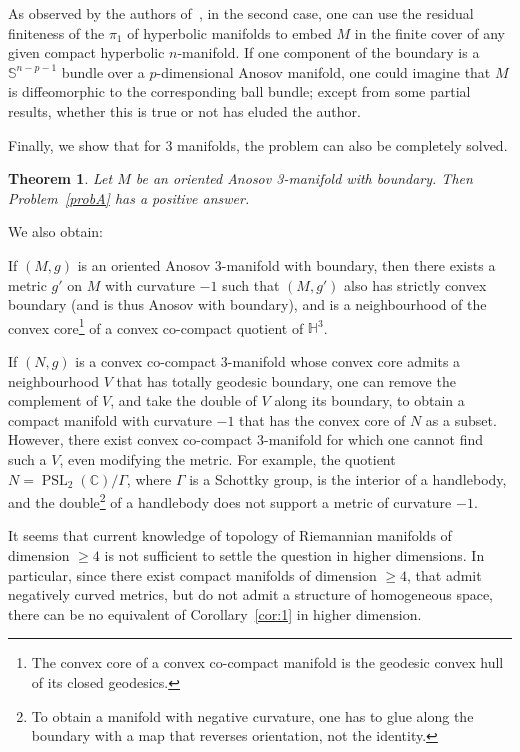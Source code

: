\documentclass[10pt]{amsart}
\newtheorem{theo}{Theorem}[section]
\theoremstyle{definition}\newtheorem{defi}[theo]{Definition}\newtheorem{rema}[theo]{Remark}\newtheorem{exam}[theo]{Example}\newtheorem{exem}[theo]{Example}\newtheorem{nota}[theo]{Notation}
\newcommand{\Ss}{\mathbb{S}}
\newcommand{\C}{\mathbb{C}}
\newcommand{\Hh}{\mathbb{H}}
\DeclareMathOperator{\PSL}{PSL}
\theoremstyle{plain}
\begin{document}
As observed by the authors of~\cite{Chen-Erchenko-Gogolev}, in the second case, one can use the residual finiteness of the $\pi_1$ of hyperbolic manifolds to embed $M$ in the finite cover of any given compact hyperbolic $n$-manifold. If one component of the boundary is a $\Ss^{n-p-1}$ bundle over a $p$-dimensional Anosov manifold, one could imagine that $M$ is diffeomorphic to the corresponding ball bundle; except from some partial results, whether this is true or not has eluded the author.

Finally, we show that for 3 manifolds, the problem can also be completely solved.

\begin{theo}\label{thm:3D}
Let $M$ be an oriented Anosov 3-manifold with boundary. Then Problem~\ref{probA} has a positive answer.
\end{theo}

We also obtain:
\begin{coro}\label{cor:1}
If $(M,g)$ is an oriented Anosov 3-manifold with boundary, then there exists a metric $g'$ on $M$ with curvature $-1$ such that $(M,g')$ also has strictly convex boundary (and is thus Anosov with boundary), and is a neighbourhood of the convex core\footnote{The convex core of a convex co-compact manifold is the geodesic convex hull of its closed geodesics.} of a convex co-compact quotient of $\Hh^3$.
\end{coro}

If $(N,g)$ is a convex co-compact 3-manifold whose convex core admits a neighbourhood $V$ that has totally geodesic boundary, one can remove the complement of $V$, and take the double of $V$ along its boundary, to obtain a compact manifold with curvature $-1$ that has the convex core of $N$ as a subset. However, there exist convex co-compact 3-manifold for which one cannot find such a $V$, even modifying the metric. For example, the quotient $N=\PSL_2(\C)/\Gamma$, where $\Gamma$ is a Schottky group, is the interior of a handlebody, and the double\footnote{To obtain a manifold with negative curvature, one has to glue along the boundary with a map that reverses orientation, not the identity.} of a handlebody does not support a metric of curvature $-1$.

It seems that current knowledge of topology of Riemannian manifolds of dimension $\geq 4$ is not sufficient to settle the question in higher dimensions. In particular, since there exist compact manifolds of dimension $\geq 4$, that admit negatively curved metrics, but do not admit a structure of homogeneous space, there can be no equivalent of Corollary~\ref{cor:1} in higher dimension.
\end{document}
